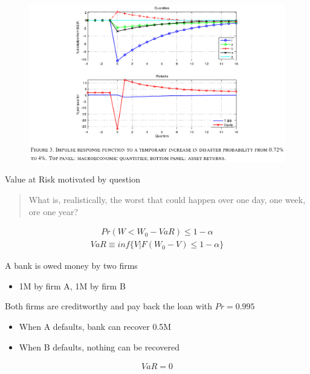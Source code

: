\documentclass{beamer}
\begin{document}
\begin{frame}
\begin{figure}
    \includegraphics[scale=.8]{gourio3.eps}
  \end{figure}
\end{frame}


\begin{frame} 
  Value at Risk motivated by question
  \begin{quote}
    What is, realistically, the worst that could happen over one day, one week, ore one year?
  \end{quote}
  \begin{align}
    Pr(W<W_0-VaR)\leq 1-\alpha
  \end{align}
  \begin{align}
    VaR \equiv inf\{V|F(W_0-V)\leq1-\alpha\}
  \end{align}
\end{frame}

\begin{frame} 
  A bank is owed money by two firms
  \begin{itemize}
    \item 1M by firm A, 1M by firm B
  \end{itemize}
  Both firms are creditworthy and pay back the loan with $Pr=0.995$
  \begin{itemize}
    \item When A defaults, bank can recover 0.5M
    \item When B defaults, nothing can be recovered
  \end{itemize}
  \begin{align}
    VaR=0
  \end{align}
\end{frame}
\end{document}
